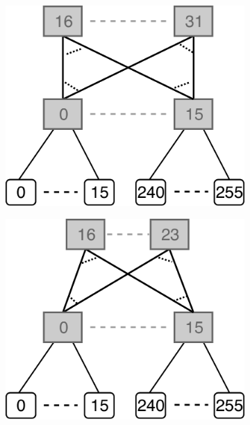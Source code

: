 \begin{figure}[t!]
    \centering
        \begin{subfigure}[t]{0.28\linewidth}
        \includegraphics[width=\textwidth, clip]{Figures/treeFull.pdf}
        \caption{}
        		\label{fig:treeFull}
    \end{subfigure}
        \hspace{0.5cm}
    \begin{subfigure}[t]{0.28\linewidth}
        \includegraphics[width=\textwidth, clip]{Figures/treeHalf.pdf}

\end{subfigure}
\end{figure}
